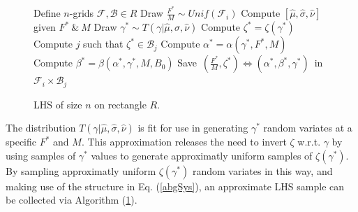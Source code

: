 %
\clearpage
%
\begin{figure}
        \vspace{-1cm}
        \begin{minipage}{0.5\textwidth}
                \begin{algorithm}[H]
                        \caption{LHS of size $n$ on rectangle $R$.}
                        \label{lhsAlg}
                        \begin{algorithmic}[1]
                        \State Define $n$-grids $\mathcal{F}, \mathcal{B}\in R$
                        \State Draw $\frac{F^*}{M} \sim Unif(\mathcal{F}_i)$
                        \State Compute $[\hat\mu, \hat\sigma, \hat\nu]$ given $F^*~\&~M$
                                \State Draw $\gamma^* \sim T(\gamma|\hat\mu, \hat\sigma, \hat\nu)$
                                \State Compute $\zeta^* = \zeta(\gamma^*)$
                                \State Compute $j$ such that $\zeta^*\in\mathcal{B}_j$
                        \EndWhile
                        \State Compute $\alpha^* = \alpha(\gamma^*, F^*, M)$
                        \State Compute $\beta^* = \beta(\alpha^*, \gamma^*, M, B_0)$
                        \State \mbox{Save $(\frac{F^*}{M}, \zeta^*)\Leftrightarrow(\alpha^*, \beta^*, \gamma^*)$ in $\mathcal{F}_i\times\mathcal{B}_j$}
                        \EndFor
                        \EndProcedure
                        \end{algorithmic}
                \end{algorithm}
        \end{minipage}
\end{figure}

The distribution $T(\gamma|\hat\mu, \hat\sigma, \hat\nu)$ is fit for use in
generating $\gamma^*$ random variates at a specific $F^*$ and $M$. This
approximation releases the need to invert $\zeta$ w.r.t. $\gamma$ by using
samples of $\gamma^*$ values to generate approximatly uniform samples of
$\zeta(\gamma^*)$. By sampling approximatly uniform $\zeta(\gamma^*)$ random
variates in this way, and making use of the structure in Eq. (\ref{abgSys}), %
an approximate LHS sample can be collected via Algorithm (\ref{lhsAlg}). %

